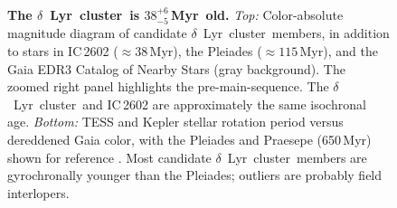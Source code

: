 \documentclass[12pt,modern,twocolumn,tighten]{aastex63}
\newcommand{\cn}{$\delta$\ Lyr\ cluster} %
\newcommand{\clusterage}{$38^{+6}_{-5}$\,Myr} %
\begin{document}
\begin{figure}[tp]
\begin{center}
		\vspace{-0.6cm}
	\end{center}
	\vspace{-0.7cm}
	\caption{
		{\bf The \cn\ is \clusterage\ old.}  {\it Top:} Color-absolute
		magnitude diagram of candidate \cn\ members, in addition to stars
		in IC\,2602 ($\approx38$\,Myr), the Pleiades ($\approx 115$\,Myr),
		and the Gaia EDR3 Catalog of Nearby Stars (gray background).  The
		zoomed right panel highlights the pre-main-sequence.  The \cn\ and
		IC\,2602 are approximately the same isochronal age.  {\it Bottom:}
		TESS and Kepler stellar rotation period versus dereddened Gaia
		color, with the Pleiades and Praesepe (650\,Myr) shown for
		reference \citep{rebull_rotation_2016a,douglas_poking_2017}.  Most
		candidate \cn\ members are gyrochronally younger than the
		Pleiades; outliers are probably field interlopers.
		\label{fig:age}
	}
\end{figure}
\end{document}
